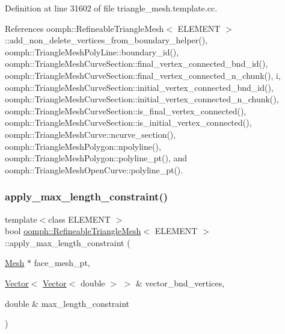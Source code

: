 Definition at line 31602 of file triangle\+\_\+mesh.\+template.\+cc.



References oomph\+::\+Refineable\+Triangle\+Mesh$<$ E\+L\+E\+M\+E\+N\+T $>$\+::add\+\_\+non\+\_\+delete\+\_\+vertices\+\_\+from\+\_\+boundary\+\_\+helper(), oomph\+::\+Triangle\+Mesh\+Poly\+Line\+::boundary\+\_\+id(), oomph\+::\+Triangle\+Mesh\+Curve\+Section\+::final\+\_\+vertex\+\_\+connected\+\_\+bnd\+\_\+id(), oomph\+::\+Triangle\+Mesh\+Curve\+Section\+::final\+\_\+vertex\+\_\+connected\+\_\+n\+\_\+chunk(), i, oomph\+::\+Triangle\+Mesh\+Curve\+Section\+::initial\+\_\+vertex\+\_\+connected\+\_\+bnd\+\_\+id(), oomph\+::\+Triangle\+Mesh\+Curve\+Section\+::initial\+\_\+vertex\+\_\+connected\+\_\+n\+\_\+chunk(), oomph\+::\+Triangle\+Mesh\+Curve\+Section\+::is\+\_\+final\+\_\+vertex\+\_\+connected(), oomph\+::\+Triangle\+Mesh\+Curve\+Section\+::is\+\_\+initial\+\_\+vertex\+\_\+connected(), oomph\+::\+Triangle\+Mesh\+Curve\+::ncurve\+\_\+section(), oomph\+::\+Triangle\+Mesh\+Polygon\+::npolyline(), oomph\+::\+Triangle\+Mesh\+Polygon\+::polyline\+\_\+pt(), and oomph\+::\+Triangle\+Mesh\+Open\+Curve\+::polyline\+\_\+pt().

\mbox{\label{classoomph_1_1RefineableTriangleMesh_abcfd90d11b4bc87de160736c0542d65c}} 
\subsubsection{\texorpdfstring{apply\+\_\+max\+\_\+length\+\_\+constraint()}{apply\_max\_length\_constraint()}}
{\footnotesize\ttfamily template$<$class E\+L\+E\+M\+E\+NT $>$ \\
bool \hyperlink{classoomph_1_1RefineableTriangleMesh}{oomph\+::\+Refineable\+Triangle\+Mesh}$<$ E\+L\+E\+M\+E\+NT $>$\+::apply\+\_\+max\+\_\+length\+\_\+constraint (\begin{DoxyParamCaption}\item[{\hyperlink{classoomph_1_1Mesh}{Mesh} $\ast$}]{face\+\_\+mesh\+\_\+pt,  }\item[{\hyperlink{classoomph_1_1Vector}{Vector}$<$ \hyperlink{classoomph_1_1Vector}{Vector}$<$ double $>$ $>$ \&}]{vector\+\_\+bnd\+\_\+vertices,  }\item[{double \&}]{max\+\_\+length\+\_\+constraint }\end{DoxyParamCaption})\hspace{0.3cm}{\ttfamily [protected]}}


